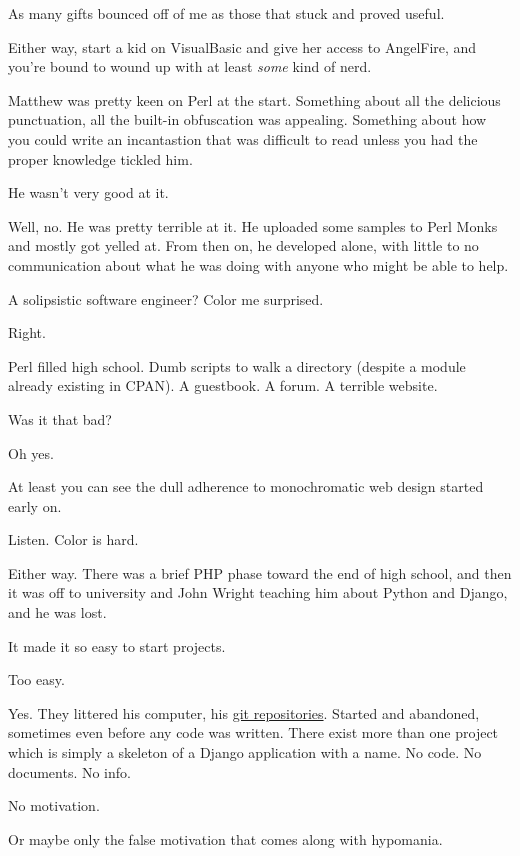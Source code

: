 As many gifts bounced off of me as those that stuck and proved useful.

Either way, start a kid on VisualBasic and give her access to AngelFire, and you're bound to wound up with at least \emph{some} kind of nerd.
\newpage

\noindent Matthew was pretty keen on Perl at the start. Something about all the delicious punctuation, all the built-in obfuscation was appealing. Something about how you could write an incantastion that was difficult to read unless you had the proper knowledge tickled him.

\begin{ally}
He wasn't very good at it.
\end{ally}
Well, no. He was pretty terrible at it. He uploaded some samples to Perl Monks and mostly got yelled at. From then on, he developed alone, with little to no communication about what he was doing with anyone who might be able to help.

\begin{ally}
A solipsistic software engineer? Color me surprised.
\end{ally}
Right.

Perl filled high school. Dumb scripts to walk a directory (despite a module already existing in CPAN). A guestbook. A forum. A terrible website.

\begin{ally}
Was it that bad?
\end{ally}
Oh yes.

\begin{ally}
At least you can see the dull adherence to monochromatic web design started early on.
\end{ally}
Listen. Color is hard.

Either way. There was a brief PHP phase toward the end of high school, and then it was off to university and John Wright teaching him about Python and Django, and he was lost.

It made it so easy to start projects.

\begin{ally}
Too easy.
\end{ally}
Yes. They littered his computer, his \href{https://github.com/makyo-old/}{git repositories}. Started and abandoned, sometimes even before any code was written. There exist more than one project which is simply a skeleton of a Django application with a name. No code. No documents. No info.

\begin{ally}
No motivation.
\end{ally}
Or maybe only the false motivation that comes along with hypomania.
\newpage

